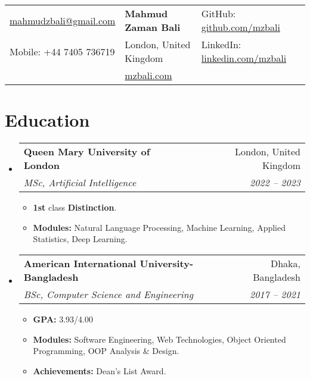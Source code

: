 \documentclass[letterpaper,11pt]{article}
\makeatletter
\newcommand{\resumeItem}[1]{
  \item\small{
    {#1 \vspace{-2pt}}
  }
}
\newcommand{\resumeSubheading}[4]{
  \vspace{-2pt}\item
    \begin{tabular*}{0.97\textwidth}[t]{l@{\extracolsep{\fill}}r}
      \textbf{#1} & #2 \\
      \textit{\small#3} & \textit{\small #4} \\
    \end{tabular*}\vspace{-7pt}
}
\newcommand{\resumeSubHeadingListStart}{\begin{itemize}[leftmargin=0.15in, label={}]}
\newcommand{\resumeSubHeadingListEnd}{\end{itemize}}
\newcommand{\resumeItemListStart}{\begin{itemize}}
\newcommand{\resumeItemListEnd}{\end{itemize}\vspace{-5pt}}
\makeatother
\begin{document}

\begin{tabularx}{\textwidth}{>{\raggedright\arraybackslash}X >{\centering\arraybackslash}X >{\raggedleft\arraybackslash}X}
    \href{mailto:mahmudzbali@gmail.com}{mahmudzbali@gmail.com} & \textbf{{\Large Mahmud Zaman Bali}} & GitHub: \href{https://github.com/mzbali}{github.com/mzbali} \\
    Mobile: +44 7405 736719 & London, United Kingdom & LinkedIn: \href{https://www.linkedin.com/in/mzbali/}{ linkedin.com/mzbali} \\
    & \href{https://mzbali.com/}{mzbali.com} & \\
\end{tabularx}




\section{Education}
  \resumeSubHeadingListStart
    \resumeSubheading
      {Queen Mary University of London}{London, United Kingdom}
      {MSc, Artificial Intelligence}{2022 -- 2023}
      \resumeItemListStart
        \resumeItem{\textbf{1st} class \textbf{Distinction}.}
        \resumeItem{\textbf{Modules:} Natural Language Processing, Machine Learning, Applied Statistics, Deep Learning.}
      \resumeItemListEnd
    \resumeSubheading
      {American International University-Bangladesh}{Dhaka, Bangladesh}
      {BSc, Computer Science and Engineering}{2017 -- 2021}
    \resumeItemListStart
        \resumeItem{\textbf{GPA:} 3.93/4.00}
        \resumeItem{\textbf{Modules:} Software Engineering, Web Technologies, Object Oriented Programming, OOP Analysis \& Design.}
        \resumeItem{\textbf{Achievements:} Dean’s List Award.}
    \resumeItemListEnd
  \resumeSubHeadingListEnd


\end{document}
